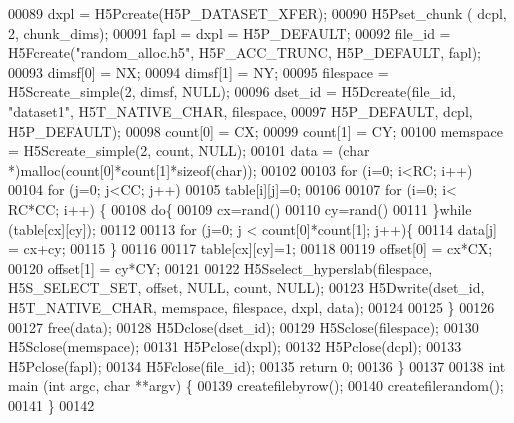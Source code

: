 \begin{DoxyCode}
00089     dxpl = H5Pcreate(H5P\_DATASET\_XFER);
00090     H5Pset\_chunk ( dcpl, 2, chunk\_dims);
00091     fapl = dxpl = H5P\_DEFAULT;
00092     file\_id = H5Fcreate(\textcolor{stringliteral}{"random\_alloc.h5"}, H5F\_ACC\_TRUNC, H5P\_DEFAULT, fapl);
00093     dimsf[0] = NX;
00094     dimsf[1] = NY;
00095     filespace = H5Screate\_simple(2, dimsf, NULL); 
00096     dset\_id = H5Dcreate(file\_id, \textcolor{stringliteral}{"dataset1"}, H5T\_NATIVE\_CHAR, filespace,
00097             H5P\_DEFAULT, dcpl, H5P\_DEFAULT);
00098     count[0] = CX;
00099     count[1] = CY;
00100     memspace = H5Screate\_simple(2, count, NULL);
00101     data = (\textcolor{keywordtype}{char} *)malloc(count[0]*count[1]*\textcolor{keyword}{sizeof}(\textcolor{keywordtype}{char}));
00102 
00103     \textcolor{keywordflow}{for} (i=0; i<RC; i++)
00104         \textcolor{keywordflow}{for} (j=0; j<CC; j++)
00105             table[i][j]=0;
00106 
00107     \textcolor{keywordflow}{for} (i=0; i< RC*CC; i++) \{ 
00108         \textcolor{keywordflow}{do}\{
00109             cx=rand()%
00110             cy=rand()%
00111         \}\textcolor{keywordflow}{while} (table[cx][cy]);
00112 
00113         \textcolor{keywordflow}{for} (j=0; j < count[0]*count[1]; j++)\{
00114             data[j] = cx+cy;
00115         \}
00116 
00117         table[cx][cy]=1;
00118         
00119         offset[0] = cx*CX;
00120         offset[1] = cy*CY;
00121 
00122         H5Sselect\_hyperslab(filespace, H5S\_SELECT\_SET, offset, NULL, count, NULL);
00123         H5Dwrite(dset\_id, H5T\_NATIVE\_CHAR, memspace, filespace, dxpl, data);
00124         
00125     \} 
00126  
00127     free(data);
00128     H5Dclose(dset\_id);
00129     H5Sclose(filespace);
00130     H5Sclose(memspace);
00131     H5Pclose(dxpl);
00132     H5Pclose(dcpl);
00133     H5Pclose(fapl);
00134     H5Fclose(file\_id);
00135     \textcolor{keywordflow}{return} 0;
00136 \}     
00137 
00138 \textcolor{keywordtype}{int} main (\textcolor{keywordtype}{int} argc, \textcolor{keywordtype}{char} **argv) \{
00139     createfilebyrow();
00140     createfilerandom();
00141 \}     
00142 
\end{DoxyCode}
